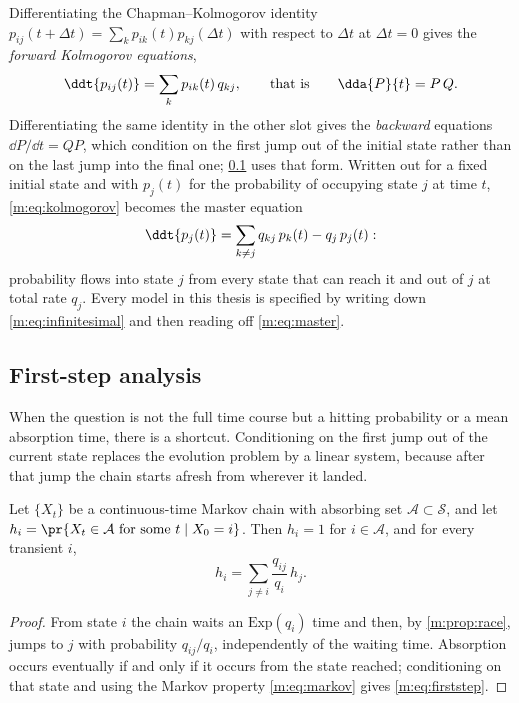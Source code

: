 Differentiating the Chapman--Kolmogorov identity
$p_{ij}(t+\Delta t) = \sum_k p_{ik}(t)p_{kj}(\Delta t)$ with respect to $\Delta t$
at $\Delta t=0$ gives the \emph{forward Kolmogorov equations},
\begin{equation}
\label{m:eq:kolmogorov}
\ddt{p_{ij}(t)} = \sum_{k} p_{ik}(t)\,q_{kj},
\qquad\text{that is}\qquad
\dda{P}{t} = P\,Q .
\end{equation}
Differentiating the same identity in the other slot gives the \emph{backward}
equations $\dd P/\dd t = QP$, which condition on the first jump out of the initial
state rather than on the last jump into the final one; \cref{m:sec:firststep} uses
that form. Written out for a fixed initial state and with $p_j(t)$ for the
probability of occupying state $j$ at time $t$, \cref{m:eq:kolmogorov} becomes the
master equation
\begin{equation}
\label{m:eq:master}
\ddt{p_j(t)} = \sum_{k\neq j}q_{kj}\,p_k(t) - q_j\,p_j(t):
\end{equation}
probability flows into state $j$ from every state that can reach it and out of $j$
at total rate $q_j$. Every model in this thesis is specified by writing down
\cref{m:eq:infinitesimal} and then reading off \cref{m:eq:master}.

\subsection{First-step analysis}
\label{m:sec:firststep}

When the question is not the full time course but a hitting probability or a mean
absorption time, there is a shortcut. Conditioning on the first jump out of the
current state replaces the evolution problem by a linear system, because after that
jump the chain starts afresh from wherever it landed.

\begin{proposition}
\label{m:prop:firststep}
Let $\{X_t\}$ be a continuous-time Markov chain with absorbing set
$\mathcal A\subset\mathcal S$, and let $h_i = \pr{X_t\in\mathcal A\text{ for some
}t\mid X_0=i}$. Then $h_i=1$ for $i\in\mathcal A$, and for every transient $i$,
\begin{equation}
\label{m:eq:firststep}
h_i = \sum_{j\neq i}\frac{q_{ij}}{q_i}\,h_j .
\end{equation}
\end{proposition}

\begin{proof}
From state $i$ the chain waits an $\mathrm{Exp}(q_i)$ time and then, by
\cref{m:prop:race}, jumps to $j$ with probability $q_{ij}/q_i$, independently of the
waiting time. Absorption occurs eventually if and only if it occurs from the state
reached; conditioning on that state and using the Markov property
\cref{m:eq:markov} gives \cref{m:eq:firststep}.
\end{proof}


